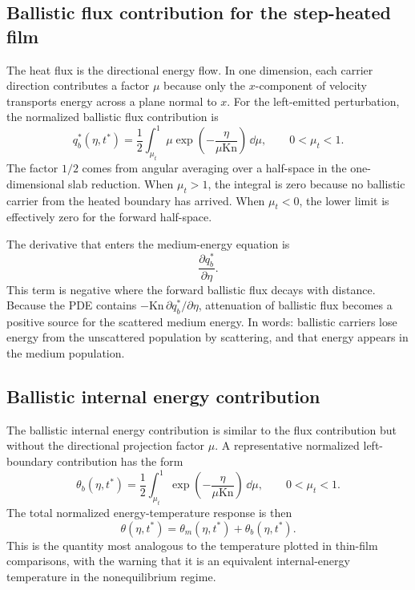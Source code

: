 \documentclass[11pt]{article}
\begin{document}
\subsection{Ballistic flux contribution for the step-heated film}
The heat flux is the directional energy flow. In one dimension, each carrier direction contributes a factor \(\mu\) because only the \(x\)-component of velocity transports energy across a plane normal to \(x\). For the left-emitted perturbation, the normalized ballistic flux contribution is
\begin{equation}
    \boxed{
    q_b^*(\eta,t^*)=\frac{1}{2}\int_{\mu_t}^{1}
    \mu\exp\left(-\frac{\eta}{\mu\mathrm{Kn}}\right)\,\dd\mu,}
    \qquad
    0<\mu_t<1.
    \label{eq:qb_star_integral_expanded}
\end{equation}
The factor \(1/2\) comes from angular averaging over a half-space in the one-dimensional slab reduction. When \(\mu_t>1\), the integral is zero because no ballistic carrier from the heated boundary has arrived. When \(\mu_t<0\), the lower limit is effectively zero for the forward half-space.

The derivative that enters the medium-energy equation is
\begin{equation}
    \frac{\partial q_b^*}{\partial\eta}.
\end{equation}
This term is negative where the forward ballistic flux decays with distance. Because the PDE contains \(-\mathrm{Kn}\,\partial q_b^*/\partial\eta\), attenuation of ballistic flux becomes a positive source for the scattered medium energy. In words: ballistic carriers lose energy from the unscattered population by scattering, and that energy appears in the medium population.

\subsection{Ballistic internal energy contribution}
The ballistic internal energy contribution is similar to the flux contribution but without the directional projection factor \(\mu\). A representative normalized left-boundary contribution has the form
\begin{equation}
    \theta_b(\eta,t^*)=\frac{1}{2}\int_{\mu_t}^{1}
    \exp\left(-\frac{\eta}{\mu\mathrm{Kn}}\right)\,\dd\mu,
    \qquad 0<\mu_t<1.
    \label{eq:theta_b_integral_expanded}
\end{equation}
The total normalized energy-temperature response is then
\begin{equation}
    \theta(\eta,t^*)=\theta_m(\eta,t^*)+\theta_b(\eta,t^*).
\end{equation}
This is the quantity most analogous to the temperature plotted in thin-film comparisons, with the warning that it is an equivalent internal-energy temperature in the nonequilibrium regime.
\end{document}
